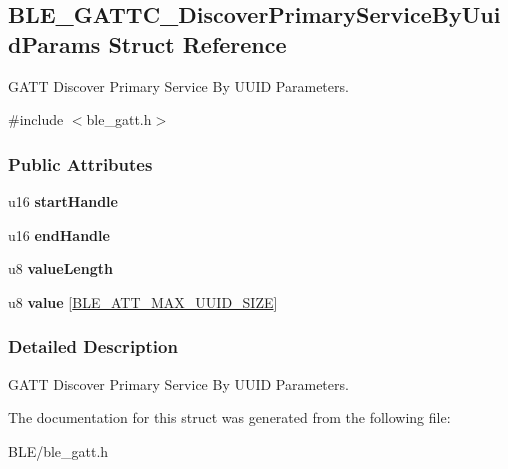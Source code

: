 \hypertarget{struct_b_l_e___g_a_t_t_c___discover_primary_service_by_uuid_params}{}\subsection{B\+L\+E\+\_\+\+G\+A\+T\+T\+C\+\_\+\+Discover\+Primary\+Service\+By\+Uuid\+Params Struct Reference}
\label{struct_b_l_e___g_a_t_t_c___discover_primary_service_by_uuid_params}


G\+A\+TT Discover Primary Service By U\+U\+ID Parameters.  




{\ttfamily \#include $<$ble\+\_\+gatt.\+h$>$}

\subsubsection*{Public Attributes}
\begin{DoxyCompactItemize}
\item 
u16 {\bfseries start\+Handle}\hypertarget{struct_b_l_e___g_a_t_t_c___discover_primary_service_by_uuid_params_a3187cea9a43fe0e2a78c143b1ee2b399}{}\label{struct_b_l_e___g_a_t_t_c___discover_primary_service_by_uuid_params_a3187cea9a43fe0e2a78c143b1ee2b399}

\item 
u16 {\bfseries end\+Handle}\hypertarget{struct_b_l_e___g_a_t_t_c___discover_primary_service_by_uuid_params_a631bcfce478960fb211722da16517b2a}{}\label{struct_b_l_e___g_a_t_t_c___discover_primary_service_by_uuid_params_a631bcfce478960fb211722da16517b2a}

\item 
u8 {\bfseries value\+Length}\hypertarget{struct_b_l_e___g_a_t_t_c___discover_primary_service_by_uuid_params_a232abd5d90b0b69bd58f2461582b66de}{}\label{struct_b_l_e___g_a_t_t_c___discover_primary_service_by_uuid_params_a232abd5d90b0b69bd58f2461582b66de}

\item 
u8 {\bfseries value} \mbox{[}\hyperlink{group___b_l_e___g_a_t_t_gaf7a0af4a975d6ef5bcb00e86d9098390}{B\+L\+E\+\_\+\+A\+T\+T\+\_\+\+M\+A\+X\+\_\+\+U\+U\+I\+D\+\_\+\+S\+I\+ZE}\mbox{]}\hypertarget{struct_b_l_e___g_a_t_t_c___discover_primary_service_by_uuid_params_a90ae119b51aa5f0b1930ea3377d14613}{}\label{struct_b_l_e___g_a_t_t_c___discover_primary_service_by_uuid_params_a90ae119b51aa5f0b1930ea3377d14613}

\end{DoxyCompactItemize}


\subsubsection{Detailed Description}
G\+A\+TT Discover Primary Service By U\+U\+ID Parameters. 

The documentation for this struct was generated from the following file\+:\begin{DoxyCompactItemize}
\item 
B\+L\+E/ble\+\_\+gatt.\+h\end{DoxyCompactItemize}

